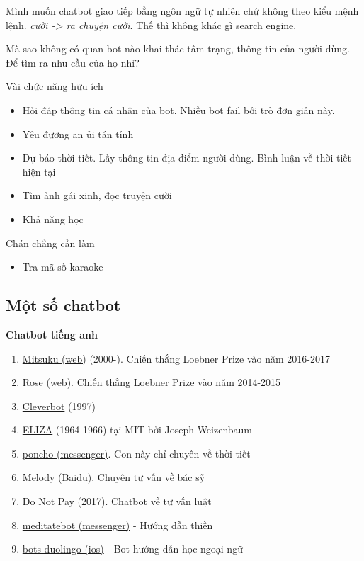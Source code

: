 Mình muốn chatbot giao tiếp bằng ngôn ngữ tự nhiên chứ không theo kiểu mệnh lệnh. \textit{cười -> ra chuyện cười}. Thế thì không khác gì search engine.

Mà sao không có quan bot nào khai thác tâm trạng, thông tin của người dùng. Để tìm ra nhu cầu của họ nhỉ?

Vài chức năng hữu ích

\begin{itemize}
  \item Hỏi đáp thông tin cá nhân của bot. Nhiều bot fail bởi trò đơn giản này.
  \item Yêu đương an ủi tán tỉnh
  \item Dự báo thời tiết. Lấy thông tin địa điểm người dùng. Bình luận về thời tiết hiện tại
  \item Tìm ảnh gái xinh, đọc truyện cười
  \item Khả năng học
\end{itemize}

Chán chẳng cần làm

\begin{itemize}
  \item Tra mã số karaoke
\end{itemize}

\subsection{Một số chatbot}

\textbf{Chatbot tiếng anh}

\begin{enumerate}
  \item \href{http://www.mitsuku.com/}{Mitsuku (web)} (2000-). Chiến thắng Loebner Prize vào năm 2016-2017
  \item  \href{http://ec2-54-215-197-164.us-west-1.compute.amazonaws.com/speech.php}{Rose (web)}. Chiến thắng Loebner Prize vào năm 2014-2015
  \item \href{http://www.cleverbot.com/ (web)}{Cleverbot} (1997)
  \item \href{https://en.wikipedia.org/wiki/ELIZA}{ELIZA} (1964-1966) tại MIT bởi Joseph Weizenbaum
  \item \href{https://poncho.is/}{poncho (messenger)}. Con này chỉ chuyên về thời tiết
  \item \href{http://research.baidu.com/baidus-melody-ai-powered-conversational-bot-doctors-patients/}{Melody (Baidu)}. Chuyên tư vấn về bác sỹ
   \item \href{https://donotpay-search-master.herokuapp.com/}{Do Not Pay} (2017). Chatbot về tư vấn luật
  \item \href{https://www.messenger.com/t/MeditateBot}{meditatebot (messenger)}  - Hướng dẫn thiền
  \item \href{http://bots.duolingo.com/}{bots duolingo (ios)}  - Bot hướng dẫn học ngoại ngữ
\end{enumerate}

